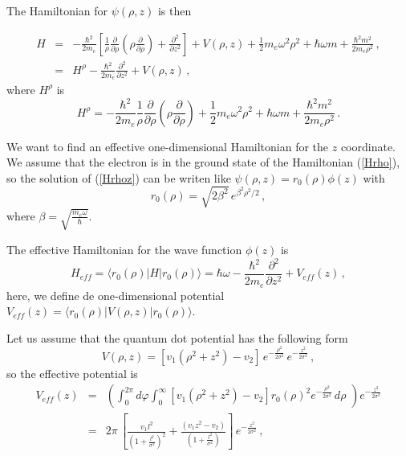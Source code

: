 \documentclass[a4paper,10pt]{article}
\begin{document}
The Hamiltonian for $\psi(\rho,z)$ is then

\begin{eqnarray}\label{Hrhoz}
H &=& -\frac{\hbar^2}{2 m_e}\left[\frac{1}{\rho}\frac{\partial}{\partial \rho}\left(\rho \frac{\partial}{\partial \rho} \right)
 + \frac{\partial^2}{\partial z^2} \right] + V(\rho, z) + \frac{1}{2} m_e \omega^2 \rho^2 + \hbar \omega m + \frac{\hbar^2 m^2}{2 m_e \rho^2}\,,\\
  &=& H^{\rho} - \frac{\hbar^2}{2 m_e}\frac{\partial^2}{\partial z^2} + V(\rho, z)\, ,
\end{eqnarray}
\noindent
where $H^{\rho}$ is
\begin{equation}\label{Hrho}
  H^{\rho} = -\frac{\hbar^2}{2 m_e} \frac{1}{\rho}\frac{\partial}{\partial \rho}\left(\rho \frac{\partial}{\partial \rho} \right) +
  \frac{1}{2} m_e \omega^2 \rho^2 + \hbar \omega m + \frac{\hbar^2 m^2}{2 m_e \rho^2}\,.
\end{equation}

We want to find an effective one-dimensional Hamiltonian for the $z$ coordinate. We assume that
the electron is in the ground state of the Hamiltonian (\ref{Hrho}), so the solution of (\ref{Hrhoz})
can be writen like $\psi(\rho, z) = r_0(\rho)\phi(z)$ with
\begin{equation}
  r_0(\rho) = \sqrt{2 \beta^2}\, e^{\beta^2 \rho^2/2}\, ,
\end{equation}
\noindent where $\beta = \sqrt{\frac{m_e \omega}{\hbar}}$.

The effective Hamiltonian for the wave function $\phi(z)$ is
\begin{equation}
  H_{eff} = \langle r_0(\rho)|H|r_0(\rho)\rangle = \hbar \omega - \frac{\hbar^2}{2 m_e}\frac{\partial^2}{\partial z^2} + V_{eff}(z)\,,
\end{equation}
\noindent here, we define de one-dimensional potential $V_{eff}(z) = \langle r_0(\rho)|V(\rho,z)|r_0(\rho)\rangle$.

Let us assume that the quantum dot potential has the following form
\begin{equation}
  V(\rho,z) = \left[v_1\left(\rho^2+z^2 \right) - v_2 \right] \,e^{-\frac{\rho^2}{2\sigma^2}}\, e^{-\frac{z^2}{2\sigma^2}}\,,
\end{equation}
\noindent so the effective potential is
\begin{eqnarray}
  V_{eff}(z) &=& \left(\int_0^{2\pi}d\varphi\int_0^{\infty} \left[v_1\left(\rho^2+z^2 \right) - v_2 \right] r_0(\rho)^2 e^{-\frac{\rho^2}{2\sigma^2}}\,d\rho\,\,\right) e^{-\frac{z^2}{2\sigma^2}} \\
             &=& 2\pi\,\left[\frac{v_1 l^2}{\left(1 + \frac{l^2}{\sigma^2}\right)^2} + \frac{(v_1 z^2 - v_2)}{\left(1 + \frac{l^2}{\sigma^2}\right)} \right]\, e^{-\frac{z^2}{2\sigma^2}}\, ,
\end{eqnarray}
\end{document}
